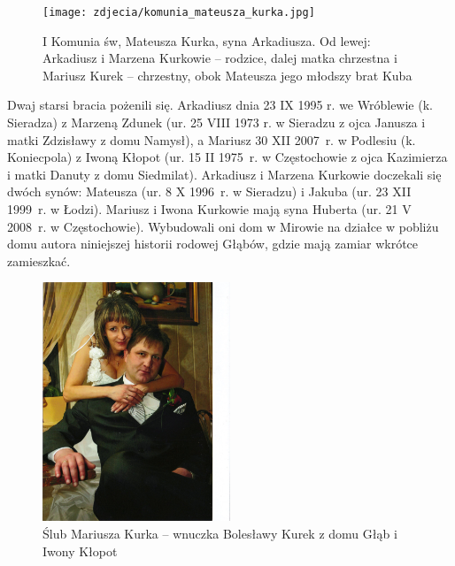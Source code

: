 \begin{figure}[!h]
\begin{center}
\texttt{[image: zdjecia/komunia\_mateusza\_kurka.jpg]}
\caption[I Komunia św, Mateusza Kurka]{I Komunia św, Mateusza Kurka, syna Arkadiusza. Od lewej: Arkadiusz i Marzena Kurkowie -- rodzice, dalej matka chrzestna i Mariusz Kurek -- chrzestny, obok Mateusza jego młodszy brat Kuba}
\label{rys:komunia_mateusza_kurka}
\end{center}
\end{figure}

Dwaj starsi bracia pożenili się. Arkadiusz dnia 23 IX 1995 r. we Wróblewie (k. Sieradza) z Marzeną Zdunek (ur. 25 VIII 1973 r. w Sieradzu z ojca Janusza i matki Zdzisławy z domu Namysł), a Mariusz 30 XII 2007~r. w Podlesiu (k. Koniecpola) z Iwoną Kłopot (ur. 15 II 1975~r. w Częstochowie z ojca Kazimierza i matki Danuty z domu Siedmilat). Arkadiusz i Marzena Kurkowie doczekali się dwóch synów: Mateusza (ur. 8 X 1996~r. w Sieradzu) i Jakuba (ur. 23 XII 1999~r. w Łodzi). Mariusz i Iwona Kurkowie mają syna Huberta (ur. 21 V 2008~r. w Częstochowie). Wybudowali oni dom w Mirowie na działce w pobliżu domu autora niniejszej historii rodowej Głąbów, gdzie mają zamiar wkrótce zamieszkać.


\begin{figure}[!h]
\begin{center}
\includegraphics[width=0.5\textwidth]{zdjecia/mariusz_i_iwona_kurek.jpg}
\caption[Ślub Mariusza Kurka z Iwoną Kłopot]{Ślub Mariusza Kurka -- wnuczka Bolesławy Kurek z domu Głąb i Iwony Kłopot}
\label{rys:mariusz_i_iwona_kurek}
\end{center}
\end{figure}

